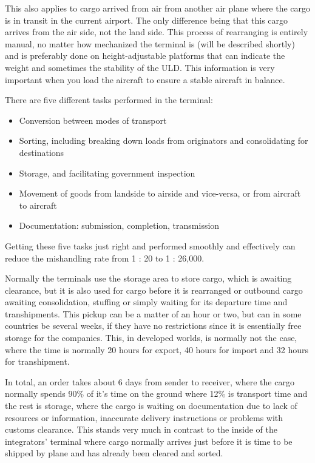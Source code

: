 This also applies to cargo arrived from air from another air plane where the cargo is in transit in the current airport. The only difference being that this cargo arrives from the air side, not the land side.
This process of rearranging is entirely manual, no matter how mechanized the terminal is (will be described shortly) and is preferably done on height-adjustable platforms that can indicate the weight and sometimes the stability of the ULD. This information is very important when you load the aircraft to ensure a stable aircraft in balance.


There are five different tasks performed in the terminal:
\begin{itemize}
\item Conversion between modes of transport
\item Sorting, including breaking down loads from originators and consolidating for destinations
\item Storage, and facilitating government inspection
\item Movement of goods from landside to airside and vice-versa, or from aircraft to aircraft
\item Documentation: submission, completion, transmission
\end{itemize}

Getting these five tasks just right and performed smoothly and effectively can reduce the mishandling rate from 1 : 20 to 1 : 26,000.

Normally the terminals use the storage area to store cargo, which is awaiting clearance, but it is also used for cargo before it is rearranged or outbound cargo awaiting consolidation, stuffing or simply waiting for its departure time and transhipments. This pickup can be a matter of an hour or two, but can in some countries be several weeks, if they have no restrictions since it is essentially free storage for the companies. This, in developed worlds, is normally not the case, where the time is normally 20 hours for export, 40 hours for import and 32 hours for transhipment.

In total, an order takes about 6 days from sender to receiver, where the cargo normally spends 90\% of it's time on the ground where 12\% is transport time and the rest is storage, where the cargo is waiting on documentation due to lack of resources or information, inaccurate delivery instructions or problems with customs clearance. This stands very much in contrast to the inside of the integrators' terminal where cargo normally arrives just before it is time to be shipped by plane and has already been cleared and sorted.

